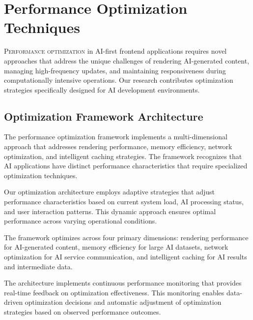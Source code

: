 
\section*{Performance Optimization Techniques}

\lettrine{P}{erformance optimization} in AI-first frontend applications requires novel approaches that address the unique challenges of rendering AI-generated content, managing high-frequency updates, and maintaining responsiveness during computationally intensive operations. Our research contributes optimization strategies specifically designed for AI development environments.

\subsection*{Optimization Framework Architecture}

The performance optimization framework implements a multi-dimensional approach that addresses rendering performance, memory efficiency, network optimization, and intelligent caching strategies. The framework recognizes that AI applications have distinct performance characteristics that require specialized optimization techniques.

Our optimization architecture employs adaptive strategies that adjust performance characteristics based on current system load, AI processing status, and user interaction patterns. This dynamic approach ensures optimal performance across varying operational conditions.

\begin{infobox}[title=Optimization Dimensions]
The framework optimizes across four primary dimensions: rendering performance for AI-generated content, memory efficiency for large AI datasets, network optimization for AI service communication, and intelligent caching for AI results and intermediate data.
\end{infobox}

The architecture implements continuous performance monitoring that provides real-time feedback on optimization effectiveness. This monitoring enables data-driven optimization decisions and automatic adjustment of optimization strategies based on observed performance outcomes.

